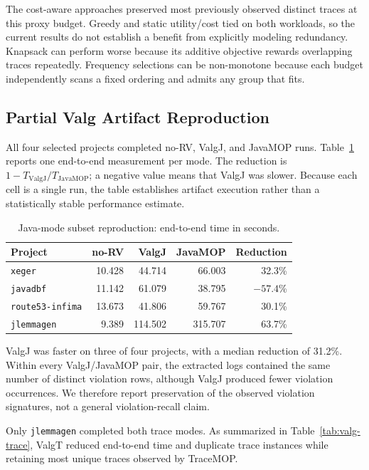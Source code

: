 \documentclass[10pt,letterpaper]{article}
\begin{document}
The cost-aware approaches preserved most previously observed distinct traces at
this proxy budget. Greedy and static utility/cost tied on both workloads, so the
current results do not establish a benefit from explicitly modeling redundancy.
Knapsack can perform worse because its additive objective rewards overlapping
traces repeatedly. Frequency selections can be non-monotone because each budget
independently scans a fixed ordering and admits any group that fits.

\subsection{Partial Valg Artifact Reproduction}

All four selected projects completed no-RV, ValgJ, and JavaMOP runs.
Table~\ref{tab:valg-java} reports one end-to-end measurement per mode. The
reduction is $1-T_{\mathrm{ValgJ}}/T_{\mathrm{JavaMOP}}$; a negative value means
that ValgJ was slower. Because each cell is a single run, the table establishes
artifact execution rather than a statistically stable performance estimate.

\begin{table}[ht]
  \centering
  \small
  \caption{Java-mode subset reproduction: end-to-end time in seconds.}
  \label{tab:valg-java}
  \begin{tabular}{lrrrr}
    \toprule
    Project & no-RV & ValgJ & JavaMOP & Reduction \\
    \midrule
    \texttt{xeger} & 10.428 & 44.714 & 66.003 & 32.3\% \\
    \texttt{javadbf} & 11.142 & 61.079 & 38.795 & $-57.4$\% \\
    \texttt{route53-infima} & 13.673 & 41.806 & 59.767 & 30.1\% \\
    \texttt{jlemmagen} & 9.389 & 114.502 & 315.707 & 63.7\% \\
    \bottomrule
  \end{tabular}
\end{table}

ValgJ was faster on three of four projects, with a median reduction of 31.2\%.
Within every ValgJ/JavaMOP pair, the extracted logs contained the same number of
distinct violation rows, although ValgJ produced fewer violation occurrences.
We therefore report preservation of the observed violation signatures, not a
general violation-recall claim.

Only \texttt{jlemmagen} completed both trace modes. As summarized in
Table~\ref{tab:valg-trace}, ValgT reduced end-to-end time and duplicate trace
instances while retaining most unique traces observed by TraceMOP.
\end{document}

